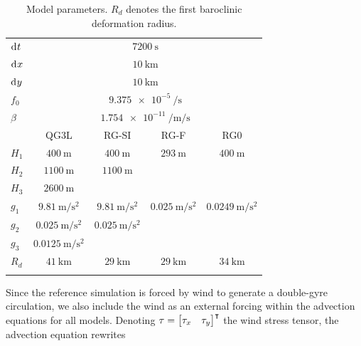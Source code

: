 \documentclass[
  draft
]{agujournal2025}
\begin{document}
\begin{table}[h]
    \begin{center}
        \begin{tabular}{lcccc}
            \savehline
            $\dt$ & \multicolumn{4}{c}{$\qty{7200}{\second}$} \\
            $\dx$ & \multicolumn{4}{c}{$\qty{10}{\kilo\meter}$} \\
            $\dy$ & \multicolumn{4}{c}{$\qty{10}{\kilo\meter}$} \\
            $f_0$ & \multicolumn{4}{c}{$\qty{9.375e-5}{\per\second}$} \\
            $\beta$ & \multicolumn{4}{c}{$\qty{1.754e-11}{\per\meter\per\second}$} \\
            \savehline
            & QG3L & RG-SI & RG-F & RG0 \\
            \savehline
            $H_1$ & $\qty{400}{\meter}$ & $\qty{400}{\meter}$ & $\qty{293}{\meter}$ & $\qty{400}{\meter}$ \\
            $H_2$ & $\qty{1100}{\meter}$ & $\qty{1100}{\meter}$ &  &  \\
            $H_3$ & $\qty{2600}{\meter}$ &  &  &  \\
            $g_1$ & $\qty{9.81}{\meter\per\second^2}$ & $\qty{9.81}{\meter\per\second^2}$ & $\qty{0.025}{\meter\per\second^2}$ & $\qty{0.0249}{\meter\per\second^2}$ \\
            $g_2$ & $\qty{0.025}{\meter\per\second^2}$ & $\qty{0.025}{\meter\per\second^2}$ &  &  \\
            $g_3$ & $\qty{0.0125}{\meter\per\second^2}$ &  &  &  \\
            \savehline
            $R_d$ & $\qty{41}{\kilo\meter}$ & $\qty{29}{\kilo\meter}$ & $\qty{29}{\kilo\meter}$ & $\qty{34}{\kilo\meter}$ \\
            \savehline \\
        \end{tabular}
    \end{center}
    \caption{Model parameters. $R_d$ denotes the first baroclinic deformation radius.}\label{tab:qg3l-model-parameters}
\end{table}

Since the reference simulation is forced by wind to generate a double-gyre circulation, we also include the wind as an external forcing within the advection equations for all models. Denoting $\tau = {\begin{bmatrix} \tau_x & \tau_y \end{bmatrix}}^{\intercal}$ the wind stress tensor, the advection equation rewrites
\end{document}
